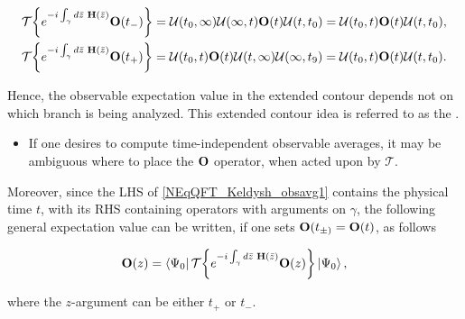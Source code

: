 \begin{equation}
    \begin{split}
        &\mathcal{T} \bigg\{
            e^{-i \int_{\gamma} d\bar{z} \textnormal{ } {\bf H}(\bar{z})} {\bf O}(t_{-}) 
        \bigg\} = \mathcal{U}(t_0, \infty) \mathcal{U}(\infty, t) {\bf O}(t) \mathcal{U}(t, t_0) 
        = \mathcal{U}(t_0,t) {\bf O}(t) \mathcal{U}(t, t_0),
        \\
        &\mathcal{T} \bigg\{
            e^{-i \int_{\gamma} d\bar{z} \textnormal{ } {\bf H}(\bar{z})} {\bf O}(t_{+}) 
        \bigg\} = \mathcal{U}(t_0, t) {\bf O}(t) \mathcal{U}(t, \infty) \mathcal{U}(\infty, t_9) = \mathcal{U}(t_0,t) {\bf O}(t) \mathcal{U}(t, t_0).
    \end{split}
\end{equation}

Hence, the observable expectation value in the extended contour depends not on which branch is being analyzed. 
This extended contour idea is referred to as the . 

\begin{remark}
\end{remark}

\begin{itemize}
    \item If one desires to compute time-independent observable averages, it may be ambiguous where to place the ${\bf O}$ operator, when acted upon by ${\mathcal{T}}$. \\
\end{itemize}

\begin{mdframed}[style=MyFrame]
    
 Moreover, since the LHS of \cref{NEqQFT_Keldysh_obsavg1} contains the physical time $t$, with its RHS containing operators with arguments on $\gamma$, the following general expectation value can be written, if one sets ${\bf O}(t_{\pm)} = {\bf O}(t)$, as follows 
 
    \begin{equation} \label{NEqQFT_Keldysh_general_obsavg}
        {\bf O}(z) =  \bra{\Psi_0}
        \mathcal{T} \bigg\{
            e^{-i \int_{\gamma} d\bar{z} \textnormal{ } {\bf H}(\bar{z})} {\bf O}(z) 
        \bigg\}
    \ket{\Psi_0},
    \end{equation}

    where the $z$-argument can be either $t_+$ or $t_-$.
        
\end{mdframed}

